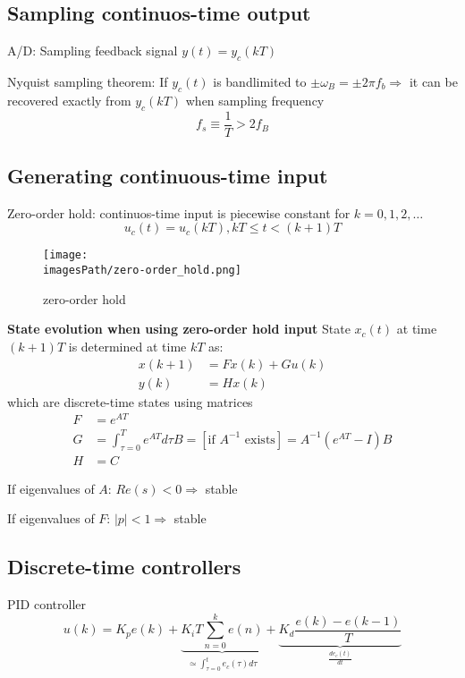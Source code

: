 \subsection{Sampling continuos-time output}
A/D: Sampling feedback signal $y(t)=y_c(kT)$

Nyquist sampling theorem:
If $y_c(t)$ is bandlimited to $\pm\omega_B = \pm2\pi f_b \Rightarrow$
it can be recovered exactly from $y_c(kT)$ when sampling frequency
\begin{equation*}
    f_s \equiv \frac{1}{T} > 2f_B
\end{equation*}

\newpage
\subsection{Generating continuous-time input}
Zero-order hold: continuos-time input is piecewise constant for $k=0,1,2,\ldots$
\begin{equation*}
    u_c(t) = u_c(kT), kT\leq t < (k+1)T
\end{equation*}

\begin{figure}[!h]
    \centering
    \texttt{[image: \\imagesPath/zero-order\_hold.png]}
    \caption{zero-order hold}
\end{figure}

\textbf{State evolution when using zero-order hold input} \newline
State $x_c(t)$ at time $(k+1)T$ is determined at time $kT$ as:
\begin{align*}
    x(k+1) &= Fx(k)+Gu(k) \\
    y(k) &= Hx(k)
\end{align*}
which are discrete-time states using matrices
\begin{align*}
    F &= e^{AT} \\
    G &= \int_{\tau=0}^{T} e^{AT} d\tau B = [\text{if } A^{-1} \text{ exists}] = A^{-1}(e^{AT}-I)B \\
    H &= C
\end{align*}

If eigenvalues of $A$: $Re(s) < 0 \Rightarrow$ stable

If eigenvalues of $F$: $|p|<1 \Rightarrow$ stable

\subsection{Discrete-time controllers}
PID controller 
\begin{equation*}
    u(k) = K_p e(k) + \underbrace{K_i T\sum_{n=0}^{k} e(n)}_{\simeq\int_{\tau=0}^te_c(\tau)d\tau} + \underbrace{K_d\frac{e(k)-e(k-1)}{T}}_{\frac{de_c(t)}{dt}}
\end{equation*}

